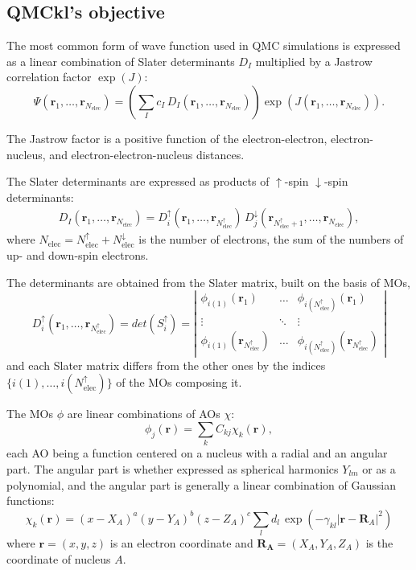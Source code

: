 \subsection{QMCkl's objective}

\newcommand{\Nelec}{N_{\text{elec}}}
\newcommand{\Nelecup}{N_{\text{elec}}^\uparrow}
\newcommand{\Nelecdn}{N_{\text{elec}}^\downarrow}
\newcommand{\br}{\mathbf{r}_1,\dots,\mathbf{r}_{\Nelec}}
\newcommand{\brup}{\mathbf{r}_1,\dots,\mathbf{r}_{\Nelec^\uparrow}}
\newcommand{\brdn}{\mathbf{r}_{\Nelec^\uparrow+1},\dots,\mathbf{r}_{\Nelec}}

The most common form of wave function used in \ac{QMC} simulations is
expressed as a linear combination of Slater determinants $D_I$ multiplied by
a Jastrow correlation factor $\exp(J)$:
\begin{equation}
  \Psi(\br) = \left( \sum_I c_I\, D_I(\br) \right) \exp \left( J(\br) \right).
\end{equation}

The Jastrow factor is a positive function of the electron-electron,
electron-nucleus, and electron-electron-nucleus distances. 

The Slater determinants are expressed as products of $\uparrow$-spin
$\downarrow$-spin determinants:
\begin{eqnarray}
D_I(\br) = D_i^\uparrow(\brup)\, D_j^\downarrow(\brdn),
\end{eqnarray}
where $\Nelec = \Nelecup + \Nelecdn$ is the number of
electrons, the sum of the numbers of up- and down-spin electrons.

The determinants are obtained from the Slater matrix, built on the basis of \acp{MO},
\begin{equation}
  D_i^\uparrow(\brup) = det(S_i^\uparrow) = \left|
    \begin{array}{ccc}
      \phi_{i(1)}(\mathbf{r}_1) & \dots & \phi_{i(\Nelecup)}(\mathbf{r}_1) \\
        \vdots & \ddots & \vdots \\
      \phi_{i(1)}(\mathbf{r}_{\Nelecup}) & \dots & \phi_{i(\Nelecup)}(\mathbf{r}_{\Nelecup}) 
    \end{array}
    \right|
\end{equation}
and each Slater matrix differs from the other ones by the indices $\{
i(1), \dots, i(\Nelecup) \}$ of the \acp{MO} composing it.

The \acp{MO} $\phi$ are linear combinations of \acp{AO} $\chi$:
\begin{equation}
\phi_j(\mathbf{r}) = \sum_k C_{kj} \chi_k(\mathbf{r}),
\end{equation}
each \ac{AO} being a function centered on a nucleus with a radial and an angular part.
The angular part is whether expressed as spherical harmonics $Y_{lm}$ or as a polynomial, and
the angular part is generally a linear combination of Gaussian functions:
\begin{equation}
\chi_k(\mathbf{r}) = (x-X_A)^a (y-Y_A)^b (z-Z_A)^c \sum_l d_l\, \exp \left(
    -\gamma_{kl} |\mathbf{r}-\mathbf{R}_A|^2 \right)
\end{equation}
where $\mathbf{r} = (x,y,z)$ is an electron coordinate and 
$\mathbf{R_A} = (X_A,Y_A,Z_A)$ is the coordinate of nucleus $A$.

